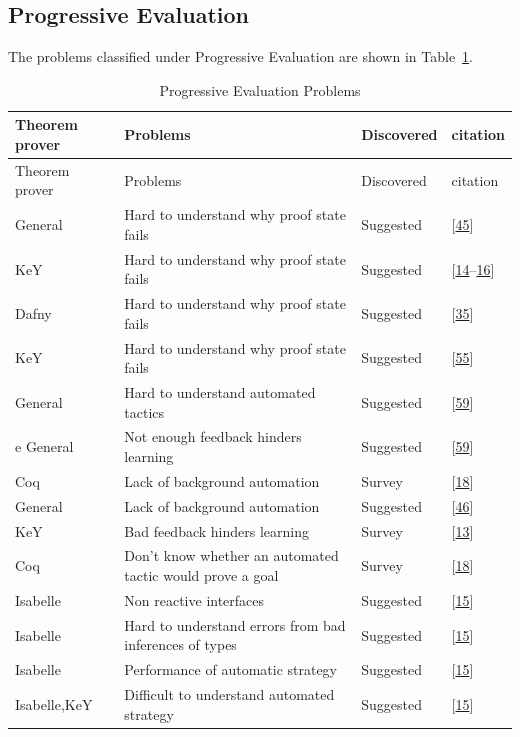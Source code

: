 \documentclass[
]{article}
\begin{document}
\hypertarget{progressive-evaluation}{%
\subsection{Progressive Evaluation}\label{progressive-evaluation}}

The problems classified under Progressive Evaluation are shown in
Table~\ref{tbl:progressive_evaluation}.

\hypertarget{tbl:progressive_evaluation}{}
\begin{longtable}[]{@{}llll@{}}
\caption{\label{tbl:progressive_evaluation}Progressive Evaluation
Problems}\tabularnewline
\toprule
Theorem prover & Problems & Discovered & citation \\
\midrule
\endfirsthead
\toprule
Theorem prover & Problems & Discovered & citation \\
\midrule
\endhead
General & Hard to understand why proof state fails & Suggested &
{[}\protect\hyperlink{ref-hentschel_interactive_2016}{45}{]} \\
KeY & Hard to understand why proof state fails & Suggested &
{[}\protect\hyperlink{ref-beckert_interactive_2015}{14}--\protect\hyperlink{ref-beckert_interaction_2017}{16}{]} \\
Dafny & Hard to understand why proof state fails & Suggested &
{[}\protect\hyperlink{ref-grebing_seamless_2020}{35}{]} \\
KeY & Hard to understand why proof state fails & Suggested &
{[}\protect\hyperlink{ref-lin_understanding_2016}{55}{]} \\
General & Hard to understand automated tactics & Suggested &
{[}\protect\hyperlink{ref-mitsch_keymaera_2017}{59}{]} \\
e General & Not enough feedback hinders learning & Suggested &
{[}\protect\hyperlink{ref-mitsch_keymaera_2017}{59}{]} \\
Coq & Lack of background automation & Survey &
{[}\protect\hyperlink{ref-berman_development_2014}{18}{]} \\
General & Lack of background automation & Suggested &
{[}\protect\hyperlink{ref-hunter_agent-based_2005}{46}{]} \\
KeY & Bad feedback hinders learning & Survey &
{[}\protect\hyperlink{ref-beckert_evaluating_2012}{13}{]} \\
Coq & Don't know whether an automated tactic would prove a goal & Survey
& {[}\protect\hyperlink{ref-berman_development_2014}{18}{]} \\
Isabelle & Non reactive interfaces & Suggested &
{[}\protect\hyperlink{ref-beckert_usability_2015}{15}{]} \\
Isabelle & Hard to understand errors from bad inferences of types &
Suggested & {[}\protect\hyperlink{ref-beckert_usability_2015}{15}{]} \\
Isabelle & Performance of automatic strategy & Suggested &
{[}\protect\hyperlink{ref-beckert_usability_2015}{15}{]} \\
Isabelle,KeY & Difficult to understand automated strategy & Suggested &
{[}\protect\hyperlink{ref-beckert_usability_2015}{15}{]} \\
\bottomrule
\end{longtable}
\end{document}
